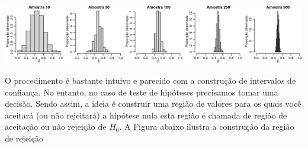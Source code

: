 \documentclass[
  10pt,
  a4paper]{book}
\begin{document}
\begin{center}\includegraphics[width=0.99\linewidth]{figures/unnamed-chunk-390-1} \end{center}

O procedimento é bastante intuivo e parecido com a construção de intervalos de confiança. No entanto, no caso de teste de hipóteses precisamos tomar uma decisão. Sendo assim, a ideia é construir uma região de valores para os quais você aceitará (ou não rejeitará) a hipótese nula esta região é chamada de região de aceitação ou não rejeição de \(H_0\).
A Figura abaixo ilustra a construção da região de rejeição
\end{document}
